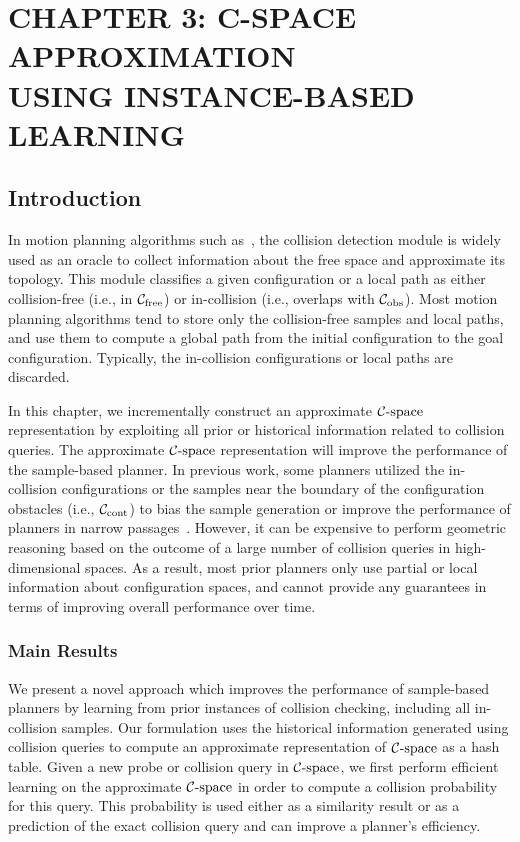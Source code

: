 \chapter[C-SPACE APPROXIMATION USING INSTANCE-BASED LEARNING]{CHAPTER 3:  C-SPACE APPROXIMATION \\ USING INSTANCE-BASED LEARNING} 
\label{chp:IBL}

\section{Introduction}
In motion planning algorithms such as~\cite{Kavraki96, Kuffner00}, the collision detection module is widely used as an oracle to collect information about the free space and approximate its topology. This module classifies a given configuration or a local path as either collision-free (i.e., in $\mathcal C_{\text{free}}$) or in-collision (i.e., overlaps with $\mathcal C_{\text{obs}}$). Most motion planning algorithms tend to store only the collision-free samples and local paths, and use them to compute a global path from the initial configuration to the goal configuration. Typically, the in-collision configurations or local paths are discarded.

In this chapter, we incrementally construct an approximate $\mathcal C\text{-space}$ representation by exploiting all prior or historical information related to collision queries. The approximate $\mathcal C\text{-space}$ representation will improve the performance of the sample-based planner. In previous work, some planners utilized the in-collision configurations or the samples near the boundary of the configuration obstacles (i.e., $\mathcal C_\text{cont}$) to bias the sample generation or improve the performance of planners in narrow passages~\cite{Boor:1999:ICRA,Jory:2011:IROS,Rodriguez:2006,Zheng:2005}. However, it can be expensive to perform geometric reasoning based on the outcome of a large number of collision queries in high-dimensional spaces. As a result, most prior planners only use partial or local information about configuration spaces, and cannot provide any guarantees in terms of improving overall performance over time.
\subsection{Main Results}
We present a novel approach which improves the performance of sample-based planners by learning from prior instances of collision checking, including all in-collision samples. Our formulation uses the historical information generated using collision queries to compute an approximate representation of $\mathcal C\text{-space}$ as a hash table. Given a new probe or collision query in $\mathcal C\text{-space}$, we first perform efficient learning on the approximate $\mathcal C\text{-space}$ in order to compute a collision probability for this query. This probability is used either as a similarity result or as a prediction of the exact collision query and can improve a planner's efficiency.

